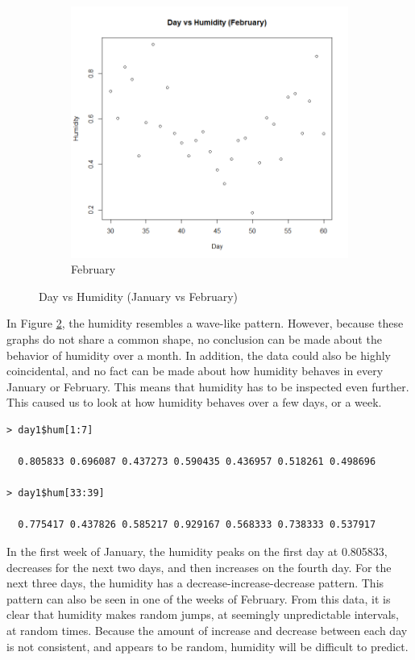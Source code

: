 \documentclass[12pt]{article}
\begin{document}
\begin{figure}[H]
\begin{subfigure}{.5\textwidth}
  \includegraphics[width=1.05\linewidth]{DvsHfeb.png}
  \caption{February}
  \label{fig:feb}
\end{subfigure}
\caption{Day vs Humidity (January vs February)}
\label{fig:2mon}
\end{figure}

In Figure \ref{fig:2mon}, the humidity resembles a wave-like pattern. However, because these graphs do not share a common shape, no conclusion can be made about the behavior of humidity over a month. In addition, the data could also be highly coincidental, and no fact can be made about how humidity behaves in every January or February. This means that humidity has to be inspected even further. This caused us to look at how humidity behaves over a few days, or a week. 

\begin{verbatim}
> day1$hum[1:7]

  0.805833 0.696087 0.437273 0.590435 0.436957 0.518261 0.498696

> day1$hum[33:39]

  0.775417 0.437826 0.585217 0.929167 0.568333 0.738333 0.537917
\end{verbatim}


In the first week of January, the humidity peaks on the first day at 0.805833, decreases for the next two days, and then increases on the fourth day. For the next three days, the humidity has a decrease-increase-decrease pattern. This pattern can also be seen in one of the weeks of February. From this data, it is clear that humidity makes random jumps, at seemingly unpredictable intervals, at random times. Because the amount of increase and decrease between each day is not consistent, and appears to be random, humidity will be difficult to predict.  
\end{document}
